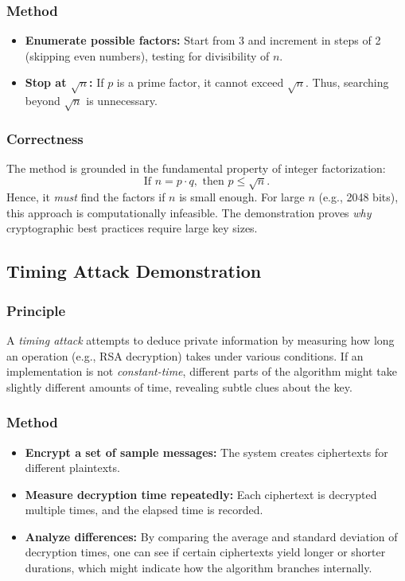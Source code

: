 \documentclass[12pt]{article}
\begin{document}
\subsubsection{Method}
\begin{itemize}
    \item \textbf{Enumerate possible factors:} Start from 3 and increment in steps of 2 (skipping even numbers), testing for divisibility of \(n\).
    \item \textbf{Stop at \(\sqrt{n}\):} If \(p\) is a prime factor, it cannot exceed \(\sqrt{n}\). Thus, searching beyond \(\sqrt{n}\) is unnecessary.
\end{itemize}

\subsubsection{Correctness}
The method is grounded in the fundamental property of integer factorization:
\[
    \text{If }n = p \cdot q,\text{ then } p \le \sqrt{n}.
\]
Hence, it \emph{must} find the factors if \(n\) is small enough. For large \(n\) (e.g., 2048 bits), this approach is computationally infeasible. The demonstration proves \emph{why} cryptographic best practices require large key sizes.

\subsection{Timing Attack Demonstration}
\subsubsection{Principle}
A \emph{timing attack} attempts to deduce private information by measuring how long an operation (e.g., RSA decryption) takes under various conditions. If an implementation is not \emph{constant-time}, different parts of the algorithm might take slightly different amounts of time, revealing subtle clues about the key.

\subsubsection{Method}
\begin{itemize}
    \item \textbf{Encrypt a set of sample messages:} The system creates ciphertexts for different plaintexts.
    \item \textbf{Measure decryption time repeatedly:} Each ciphertext is decrypted multiple times, and the elapsed time is recorded.
    \item \textbf{Analyze differences:} By comparing the average and standard deviation of decryption times, one can see if certain ciphertexts yield longer or shorter durations, which might indicate how the algorithm branches internally.
\end{itemize}
\end{document}
